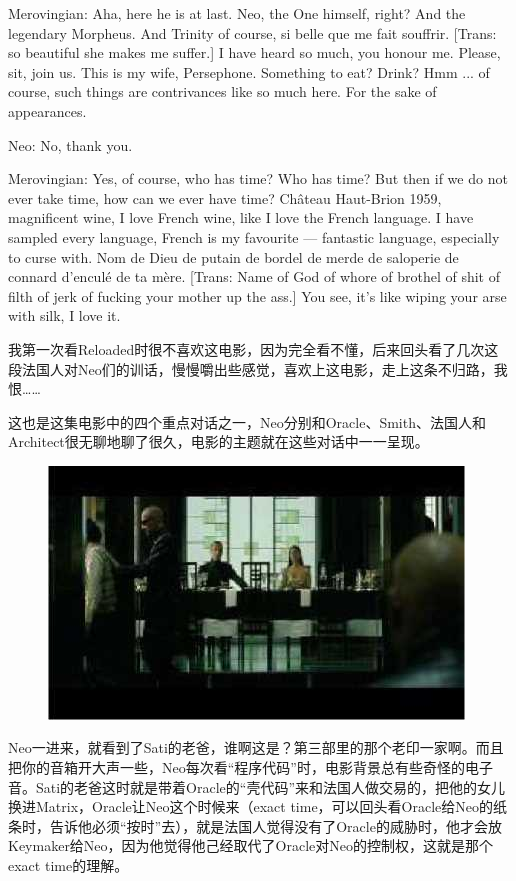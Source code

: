 \documentclass{ctexart}
\newenvironment{myquote}{\color{green} \setlength{\leftskip}{6em} \setlength{\rightskip}{4em} \setlength{\parindent}{-2em}}{\par}
\begin{document}
\begin{myquote}
Merovingian: Aha, here he is at last. Neo, the One himself, right? And the legendary Morpheus. And Trinity of course, si belle que me fait souffrir. [Trans: so beautiful she makes me suffer.] I have heard so much, you honour me. Please, sit, join us. This is my wife, Persephone. Something to eat? Drink? Hmm ... of course, such things are contrivances like so much here. For the sake of appearances.

Neo: No, thank you.

Merovingian: Yes, of course, who has time? Who has time? But then if we do not ever take time, how can we ever have time? Château Haut-Brion 1959, magnificent wine, I love French wine, like I love the French language. I have sampled every language, French is my favourite --- fantastic language, especially to curse with. Nom de Dieu de putain de bordel de merde de saloperie de connard d'enculé de ta mère. [Trans: Name of God of whore of brothel of shit of filth of jerk of fucking your mother up the ass.] You see, it's like wiping your arse with silk, I love it.
\end{myquote}

我第一次看Reloaded时很不喜欢这电影，因为完全看不懂，后来回头看了几次这段法国人对Neo们的训话，慢慢嚼出些感觉，喜欢上这电影，走上这条不归路，我恨……

这也是这集电影中的四个重点对话之一，Neo分别和Oracle、Smith、法国人和Architect很无聊地聊了很久，电影的主题就在这些对话中一一呈现。

\begin{figure}[htb]
\centering
\includegraphics[width=0.5\linewidth]{fig/read_reloaded-90}
\end{figure}

Neo一进来，就看到了Sati的老爸，谁啊这是？第三部里的那个老印一家啊。而且把你的音箱开大声一些，Neo每次看“程序代码”时，电影背景总有些奇怪的电子音。Sati的老爸这时就是带着Oracle的“壳代码”来和法国人做交易的，把他的女儿换进Matrix，Oracle让Neo这个时候来（exact time，可以回头看Oracle给Neo的纸条时，告诉他必须“按时”去），就是法国人觉得没有了Oracle的烕胁时，他才会放Keymaker给Neo，因为他觉得他己经取代了Oracle对Neo的控制权，这就是那个exact time的理解。
\end{document}

